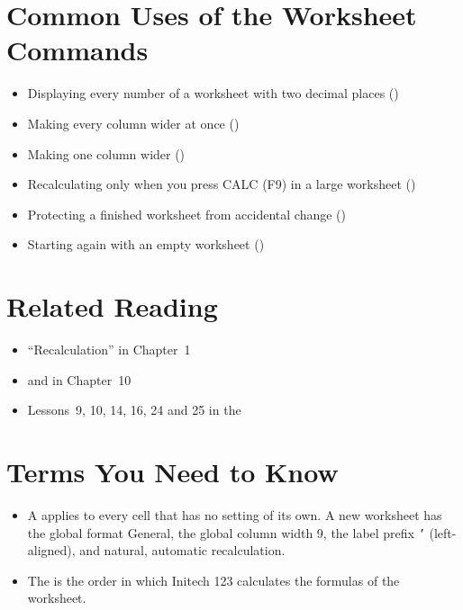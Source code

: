 \clearpage
\CompactTree


\section{Common Uses of the Worksheet Commands}
\begin{itemize}
\item Displaying every number of a worksheet with two decimal places
  ()
\item Making every column wider at once
  ()
\item Making one column wider ()
\item Recalculating only when you press CALC (F9) in a large worksheet
  ()
\item Protecting a finished worksheet from accidental change
  ()
\item Starting again with an empty worksheet ()
\end{itemize}

\section{Related Reading}
\begin{itemize}
\item ``Recalculation'' in Chapter~1
\item {} and  in Chapter~10
\item Lessons~9, 10, 14, 16, 24 and 25 in the 
\end{itemize}

\section{Terms You Need to Know}
\begin{itemize}
\item A  applies to every cell that has no setting of
  its own.  A new worksheet has the global format General, the global
  column width 9, the label prefix \texttt{'} (left-aligned), and natural,
  automatic recalculation.
\item The  is the order in which Initech 123
  calculates the formulas of the worksheet.
\end{itemize}

